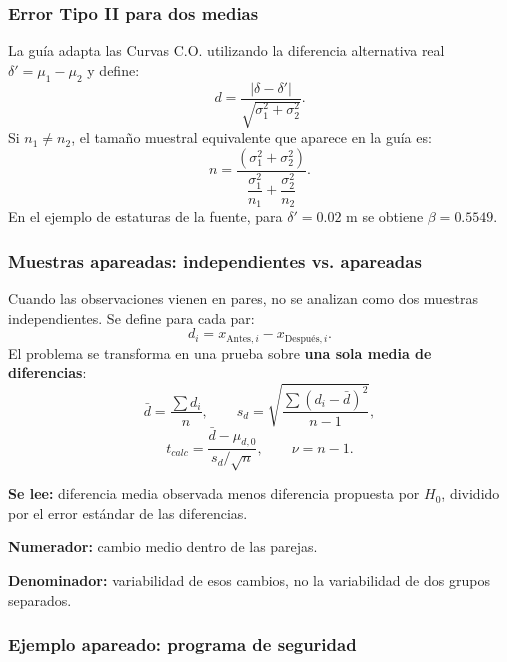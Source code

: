 \documentclass[11pt,a4paper]{article}
\begin{document}
\subsubsection{Error Tipo II para dos medias}

La guía adapta las Curvas C.O. utilizando la diferencia alternativa real $\delta'=\mu_1-\mu_2$ y define:
\[
d=\frac{|\delta-\delta'|}{\sqrt{\sigma_1^2+\sigma_2^2}}.
\]
Si $n_1\neq n_2$, el tamaño muestral equivalente que aparece en la guía es:
\[
 n=\frac{(\sigma_1^2+\sigma_2^2)}
 {\dfrac{\sigma_1^2}{n_1}+\dfrac{\sigma_2^2}{n_2}}.
\]
En el ejemplo de estaturas de la fuente, para $\delta'=0.02$ m se obtiene $\beta=0.5549$.

\subsubsection{Muestras apareadas: independientes vs. apareadas}

Cuando las observaciones vienen en pares, no se analizan como dos muestras independientes. Se define para cada par:
\[
d_i=x_{\text{Antes},i}-x_{\text{Después},i}.
\]
El problema se transforma en una prueba sobre \textbf{una sola media de diferencias}:
\[
\bar d=\frac{\sum d_i}{n},
\qquad
s_d=\sqrt{\frac{\sum(d_i-\bar d)^2}{n-1}},
\]
\[
 t_{calc}=\frac{\bar d-\mu_{d,0}}{s_d/\sqrt n},
 \qquad \nu=n-1.
\]
\begin{leerformula}
\textbf{Se lee:} diferencia media observada menos diferencia propuesta por $H_0$, dividido por el error estándar de las diferencias.\par
\textbf{Numerador:} cambio medio dentro de las parejas.\par
\textbf{Denominador:} variabilidad de esos cambios, no la variabilidad de dos grupos separados.
\end{leerformula}

\begin{center}
\end{center}

\subsubsection{Ejemplo apareado: programa de seguridad}
\end{document}
